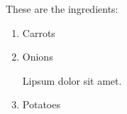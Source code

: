\documentclass{article}
\begin{document}
These are the ingredients:
\begin{enumerate}
    \item Carrots
    \item Onions
    
    Lipsum dolor sit amet.
    \item Potatoes
\end{enumerate}
\end{document}
